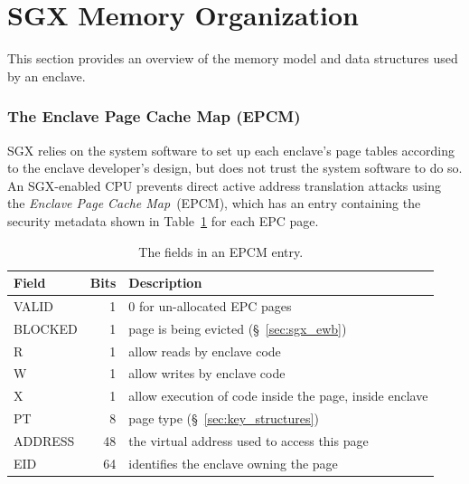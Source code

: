\section{SGX Memory Organization}
\label{sec:memory}

This section provides an overview of the memory model and  data structures used
by an enclave.




\subsubsection{The Enclave Page Cache Map (EPCM)}


SGX relies on the system software to set up each enclave's page tables
according to the enclave developer's design, but does not trust the system
software to do so. An SGX-enabled CPU prevents direct active address
translation attacks using the \textit{Enclave Page Cache Map}~(EPCM), which has
an entry containing the security metadata shown in
Table~\ref{fig:sgx_epcm_entry}
for each EPC page.



\begin{table}[hbt]
  \centering
  \begin{tabularx}{\columnwidth}{| l | r | X |}
  \hline
  \textbf{Field} & \textbf{Bits} & \textbf{Description}\\
  \hline
  VALID & 1 & 0 for un-allocated EPC pages \\
  \hline
  BLOCKED & 1 & page is being evicted (\S~\ref{sec:sgx_ewb})\\
  \hline
  R & 1 & allow reads by enclave code\\
  \hline
  W & 1 & allow writes by enclave code\\
  \hline
  X & 1 & allow execution of code inside the page, inside enclave\\
  \hline
  PT & 8 & page type (\S~\ref{sec:key_structures})\\
  \hline
  ADDRESS & 48 & the virtual address used to access this page\\
  \hline
  EID & 64 & identifies the enclave owning the page\\
  \hline
  \end{tabularx}
  \caption{
    The fields in an EPCM entry.
  }
  \label{fig:sgx_epcm_entry}
\end{table}

